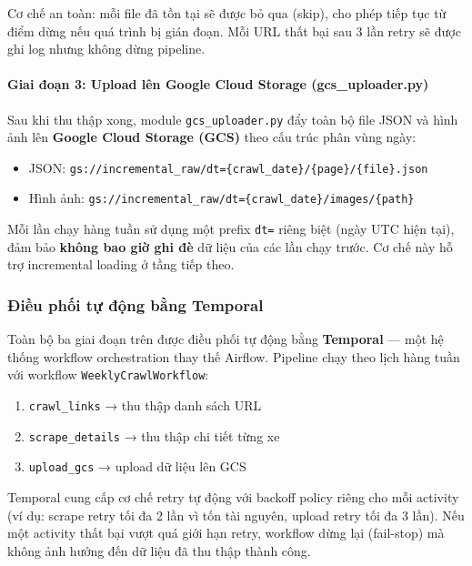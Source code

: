 Cơ chế an toàn: mỗi file đã tồn tại sẽ được bỏ qua (skip), cho phép tiếp tục từ điểm dừng nếu quá trình bị gián đoạn. Mỗi URL thất bại sau 3 lần retry sẽ được ghi log nhưng không dừng pipeline.

\paragraph{Giai đoạn 3: Upload lên Google Cloud Storage (gcs\_uploader.py)}

Sau khi thu thập xong, module \texttt{gcs\_uploader.py} đẩy toàn bộ file JSON và hình ảnh lên \textbf{Google Cloud Storage (GCS)} theo cấu trúc phân vùng ngày:

\begin{itemize}
    \item JSON: \texttt{gs://incremental\_raw/dt=\{crawl\_date\}/\{page\}/\{file\}.json}
    \item Hình ảnh: \texttt{gs://incremental\_raw/dt=\{crawl\_date\}/images/\{path\}}
\end{itemize}

Mỗi lần chạy hàng tuần sử dụng một prefix \texttt{dt=} riêng biệt (ngày UTC hiện tại), đảm bảo \textbf{không bao giờ ghi đè} dữ liệu của các lần chạy trước. Cơ chế này hỗ trợ incremental loading ở tầng tiếp theo.

\subsubsection{Điều phối tự động bằng Temporal}

Toàn bộ ba giai đoạn trên được điều phối tự động bằng \textbf{Temporal} — một hệ thống workflow orchestration thay thế Airflow. Pipeline chạy theo lịch hàng tuần với workflow \texttt{WeeklyCrawlWorkflow}:

\begin{enumerate}
    \item \texttt{crawl\_links} → thu thập danh sách URL
    \item \texttt{scrape\_details} → thu thập chi tiết từng xe
    \item \texttt{upload\_gcs} → upload dữ liệu lên GCS
\end{enumerate}

Temporal cung cấp cơ chế retry tự động với backoff policy riêng cho mỗi activity (ví dụ: scrape retry tối đa 2 lần vì tốn tài nguyên, upload retry tối đa 3 lần). Nếu một activity thất bại vượt quá giới hạn retry, workflow dừng lại (fail-stop) mà không ảnh hưởng đến dữ liệu đã thu thập thành công.

